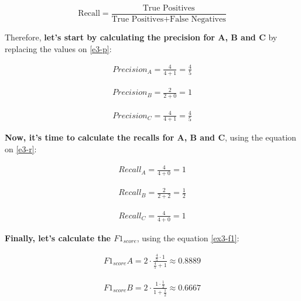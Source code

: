 \documentclass[12pt]{article}
\begin{document}
\begin{enumerate}[leftmargin=\labelsep]
    \begin{equation}\label{e3-r}
        \text{Recall} = \frac{\text{True Positives}}{{\text{True Positives} + \text{False Negatives}}}
    \end{equation}

    Therefore, \textbf{let's start by calculating the precision for A, B and C} by replacing the values on \eqref{e3-p}:

    \[
        \begin{aligned}
            Precision_A = \frac{4}{4+1} = \frac{4}{5}
        \end{aligned}
    \]

    \[
        \begin{aligned}
            Precision_B = \frac{2}{2+0} = 1
        \end{aligned}
    \]

    \[
        \begin{aligned}
            Precision_C = \frac{4}{4+1} = \frac{4}{5}
        \end{aligned}
    \]


    \textbf{Now, it's time to calculate the recalls for A, B and C}, using the equation on \eqref{e3-r}:

    \[
        \begin{aligned}
            Recall_A = \frac{4}{4+0} = 1
        \end{aligned}
    \]

    \[
        \begin{aligned}
            Recall_B = \frac{2}{2+2} = \frac{1}{2}
        \end{aligned}
    \]

    \[
        \begin{aligned}
            Recall_C = \frac{4}{4+0} = 1
        \end{aligned}
    \]

    \textbf{Finally, let's calculate the $F1_{score}$}, using the equation \eqref{ex3-f1}:

    \[
        \begin{aligned}
            F1_{score} A = 2 \cdot \frac{{ \frac{4}{5} \cdot 1 }}{{ \frac{4}{5} + 1 }} \approx 0.8889
        \end{aligned}
    \]

    \[
        \begin{aligned}
            F1_{score} B = 2 \cdot \frac{{ 1 \cdot \frac{1}{2} }}{{ 1 + \frac{1}{2} }} \approx 0.6667
        \end{aligned}
    \]


\end{enumerate}
\end{document}
